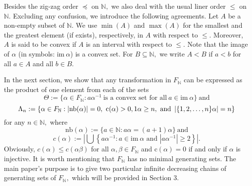 \documentclass[11pt]{article}
\theoremstyle{plain}
\theoremstyle{definition}
\newcommand{\im}{\mathrm{im~}}
\newcommand{\collapse}{\mathrm{c}}
\newcommand{\nb}{\mathrm{nb}}
\begin{document}
Besides the zig-zag order $\preceq$ on $\mathbb{N},$ we also deal with the usual liner order $\leq$ on $\mathbb{N}.$ Excluding any confusion, we introduce the following agreements. Let $A$ be a non-empty subset of $\mathbb{N}.$ We use $\min (A)$ and $\max(A)$ for the smallest and the greatest element (if exists), respectively, in $A$ with respect to $\leq.$ Moreover, $A$ is said to be convex if $A$ is an interval with respect to $\leq.$ Note that the image of $\alpha$ (in symbols: $\im\alpha$) is a convex set. For $B\subseteq \mathbb{N},$ we write $A<B$ if $a<b$ for all $a\in A$ and all $b\in B.$

In the next section, we show that any transformation in $F_{\mathbb{N}}$ can be expressed as the product of one element from each of the sets $$\Theta:=\{\alpha\in F_{\mathbb{N}}:a\alpha^{-1}~\text{is a convex }\text{set for all}~a\in\im\alpha\}~\text{and}$$ $$\Lambda_{n}:=\{\alpha\in F_{\mathbb{N}}:\left\vert\nb(\alpha)\right\vert=0,~\collapse(\alpha)>0,\\1\alpha\geq n,~\text{and}~\left\vert \{1,2,\ldots,n\}\alpha\right\vert=n\}$$
for any $n\in \mathbb{N},$ where  
$$\nb(\alpha):=\{a\in\mathbb{N}:a\alpha=(a+1)\alpha\}~\text{and}$$ $$c(\alpha):=\left\vert\bigcup \left\{ a\alpha ^{-1}:a\in \im\alpha \text{ and }\left\vert a\alpha ^{-1}\right\vert \geq 2\right\}\right\vert.$$ 
Obviously, $c(\alpha)\leq c(\alpha\beta)$ for all $\alpha,\beta\in F_{\mathbb{N}}$ and $\collapse(\alpha)=0$ if and only if $\alpha$ is injective. It is worth mentioning that $F_{\mathbb{N}}$ has no minimal generating sets. The main paper's purpose is to give two particular infinite decreasing chains of generating sets of $F_{\mathbb{N}},$ which will be provided in Section 3.
\end{document}
